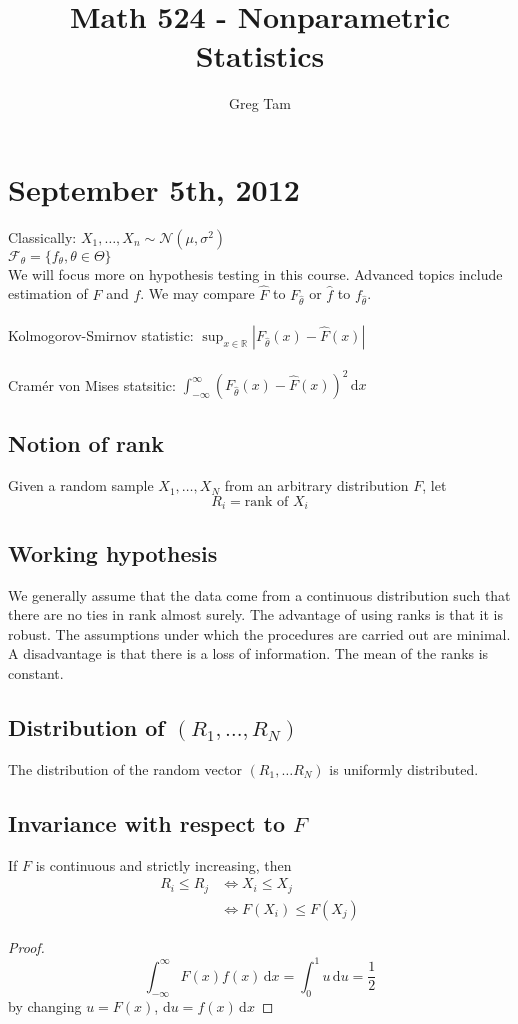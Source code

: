 \documentclass[a4paper,12pt]{amsart}
\newcommand{\dx}{\,\mathrm{d}x}
\begin{document}
\title{Math 524 - Nonparametric Statistics}
\author{Greg Tam}
\date{}
\maketitle
\tableofcontents

\section{September 5th, 2012}
\noindent
Classically: $X_1,\ldots,X_n \sim \mathcal{N}(\mu,\sigma^2)$\\
$\mathcal{F}_\theta = \{f_\theta, \theta \in \Theta\}$\\
We will focus more on hypothesis testing in this course. Advanced topics include estimation of $F$ and $f$. We may compare $\widehat{F}$ to $F_{\widehat{\theta}}$ or $\widehat{f}$ to $f_{\widehat{\theta}}$.\\
\\
\noindent
Kolmogorov-Smirnov statistic: $\displaystyle \sup_{x \in \mathbb{R}} \left| F_{\widehat{\theta}}(x) - \widehat{F}(x)\right|$\\
\\
\noindent
Cram\'er von Mises statsitic: $\displaystyle \int_{-\infty}^\infty \! (F_{\widehat{\theta}}(x) - \widehat{F}(x))^2 \dx$

\subsection{Notion of rank}
Given a random sample $X_1,\ldots,X_N$ from an arbitrary distribution $F$, let
\[R_i = \mbox{rank of } X_i\]
\subsection{Working hypothesis}
We generally assume that the data come from a continuous distribution such that there are no ties in rank almost surely. The advantage of using ranks is that it is robust. The assumptions under which the procedures are carried out are minimal. A disadvantage is that there is a loss of information. The mean of the ranks is constant. 

\subsection{Distribution of $(R_1,\ldots,R_N)$}
The distribution of the random vector $(R_1,\ldots R_N)$ is uniformly distributed.
\subsection{Invariance with respect to $F$}
If $F$ is continuous and strictly increasing, then
\begin{align*}
R_i \leq R_j &\Leftrightarrow X_i \leq X_j\\
			&\Leftrightarrow F(X_i) \leq F(X_j)
\end{align*}
\begin{proof}
\[\int_{-\infty}^\infty \! F(x) f(x) \dx  = \int_0^1 u \, \mathrm{d}u = \frac{1}{2}\]
by changing $u = F(x)$, $\mathrm{d}u = f(x)\dx$
\end{proof}
\end{document}
